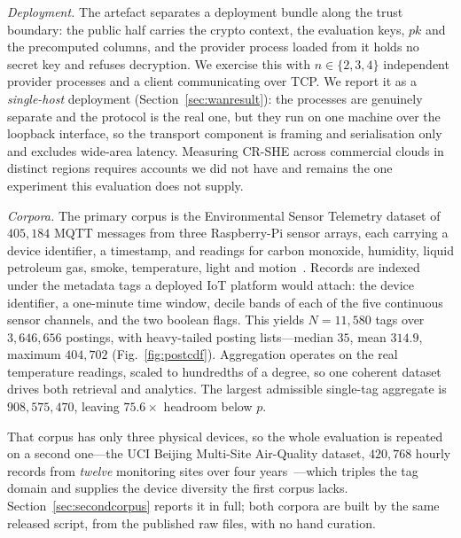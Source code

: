 \documentclass[journal]{IEEEtran}
\begin{document}
\emph{Deployment.} The artefact separates a deployment bundle along the trust
boundary: the public half carries the crypto context, the evaluation keys, $pk$
and the precomputed columns, and the provider process loaded from it holds no
secret key and refuses decryption. We exercise this with $n\in\{2,3,4\}$
independent provider processes and a client communicating over TCP. We report
it as a \emph{single-host} deployment (Section~\ref{sec:wanresult}): the
processes are genuinely separate and the protocol is the real one, but they run
on one machine over the loopback interface, so the transport component is
framing and serialisation only and excludes wide-area latency. Measuring CR-SHE
across commercial clouds in distinct regions requires accounts we did not have
and remains the one experiment this evaluation does not supply.

\emph{Corpora.} The primary corpus is the Environmental Sensor Telemetry
dataset of $405{,}184$ MQTT messages from three Raspberry-Pi sensor arrays, each
carrying a device identifier, a timestamp, and readings for carbon monoxide,
humidity, liquid petroleum gas, smoke, temperature, light and
motion~\cite{stafford_2020_environmental}. Records are indexed under the
metadata tags a deployed IoT platform would attach: the device identifier, a
one-minute time window, decile bands of each of the five continuous sensor
channels, and the two boolean flags. This yields $N=11{,}580$ tags over
$3{,}646{,}656$ postings, with heavy-tailed posting lists---median $35$, mean
$314.9$, maximum $404{,}702$ (Fig.~\ref{fig:postcdf}). Aggregation operates on
the real temperature readings, scaled to hundredths of a degree, so one coherent
dataset drives both retrieval and analytics. The largest admissible single-tag
aggregate is $908{,}575{,}470$, leaving $75.6\times$ headroom below $p$.

That corpus has only three physical devices, so the whole evaluation is
repeated on a second one---the UCI Beijing Multi-Site Air-Quality dataset,
$420{,}768$ hourly records from \emph{twelve} monitoring sites over four
years~\cite{zhang2017cautionary}---which triples the tag domain and supplies the
device diversity the first corpus lacks. Section~\ref{sec:secondcorpus} reports
it in full; both corpora are built by the same released script, from the
published raw files, with no hand curation.
\end{document}
